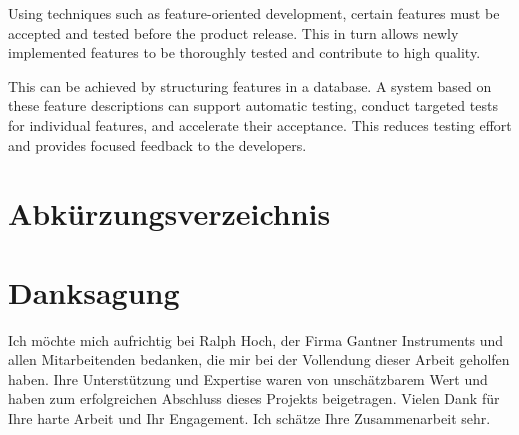 \documentclass[a4paper, fontsize=11pt, parskip=half, twoside]{scrreprt}
\begin{document}
	Using techniques such as feature-oriented development, certain features must be accepted and tested before the product release. 
	This in turn allows newly implemented features to be thoroughly tested and contribute to high quality. 
	
	This can be achieved by structuring features in a database. 
	A system based on these feature descriptions can support automatic testing, conduct targeted tests for individual features, and accelerate their acceptance. 
	This reduces testing effort and provides focused feedback to the developers.
	
	\cleardoublepage   %
	\setcounter{tocdepth}{2}
	\setcounter{secnumdepth}{4}
	\tableofcontents
	
	\clearpage
	\listoffigures
	
	\clearpage
	\section*{Abkürzungsverzeichnis}
	\begin{acronym}
	
	\end{acronym}
	
	\clearpage
	\section*{Danksagung}
	Ich möchte mich aufrichtig bei Ralph Hoch, der Firma Gantner Instruments und allen Mitarbeitenden bedanken, die mir bei der Vollendung dieser Arbeit geholfen haben. 
	Ihre Unterstützung und Expertise waren von unschätzbarem Wert und haben zum erfolgreichen Abschluss dieses Projekts beigetragen. 
	Vielen Dank für Ihre harte Arbeit und Ihr Engagement. 
	Ich schätze Ihre Zusammenarbeit sehr.
	
\end{document}
